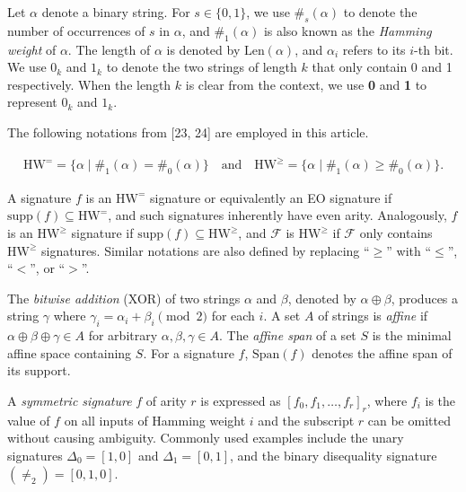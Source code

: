 Let $\alpha$ denote a binary string. For $s\in\{0,1\}$, we use $\#_{s}(\alpha)$ to denote the number of occurrences of $s$ in $\alpha$, and $\#_{1}(\alpha)$ is also known as the \emph{Hamming weight} of $\alpha$. The length of $\alpha$ is denoted by $\text{Len}(\alpha)$, and $\alpha_{i}$ refers to its $i$-th bit. We use $0_{k}$ and $1_{k}$ to denote the two strings of length $k$ that only contain 0 and 1 respectively. When the length $k$ is clear from the context, we use \textbf{0} and \textbf{1} to represent $0_{k}$ and $1_{k}$.\par




The following notations from [23, 24] are employed in this article.\par


\[\begin{gathered}
\text{HW}^{=}=\{\alpha\mid\#_{1}(\alpha)=\#_{0}(\alpha)\}\quad\text{and}\quad\text{HW}^{\geq}=\{\alpha\mid\#_{1}(\alpha)\geq\#_{0}(\alpha)\}.
\end{gathered}\]


A signature $f$ is an $\text{HW}^{=}$ signature or equivalently an EO signature if $\text{supp}(f)\subseteq\text{HW}^{=}$, and such signatures inherently have even arity. Analogously, $f$ is an $\text{HW}^{\geq}$ signature if $\text{supp}(f)\subseteq\text{HW}^{\geq}$, and $\mathcal{F}$ is $\text{HW}^{\geq}$ if $\mathcal{F}$ only contains $\text{HW}^{\geq}$ signatures. Similar notations are also defined by replacing “$\geq$” with “$\leq$”, “$<$”, or “$>$”.\par




The \emph{bitwise addition} (XOR) of two strings $\alpha$ and $\beta$, denoted by $\alpha\oplus\beta$, produces a string $\gamma$ where $\gamma_{i}=\alpha_{i}+\beta_{i}\pmod{2}$ for each $i$. A set $A$ of strings is \emph{affine} if $\alpha\oplus\beta\oplus\gamma\in A$ for arbitrary $\alpha,\beta,\gamma\in A$. The \emph{affine span} of a set $S$ is the minimal affine space containing $S$. For a signature $f$, $\text{Span}(f)$ denotes the affine span of its support.\par




A \emph{symmetric signature} $f$ of arity $r$ is expressed as $[f_{0},f_{1},\ldots,f_{r}]_{r}$, where $f_{i}$ is the value of $f$ on all inputs of Hamming weight $i$ and the subscript $r$ can be omitted without causing ambiguity.
Commonly used examples include the unary signatures $\Delta_{0}=[1,0]$ and $\Delta_{1}=[0,1]$, and the binary disequality signature $(\neq_{2})=[0,1,0]$.\par




